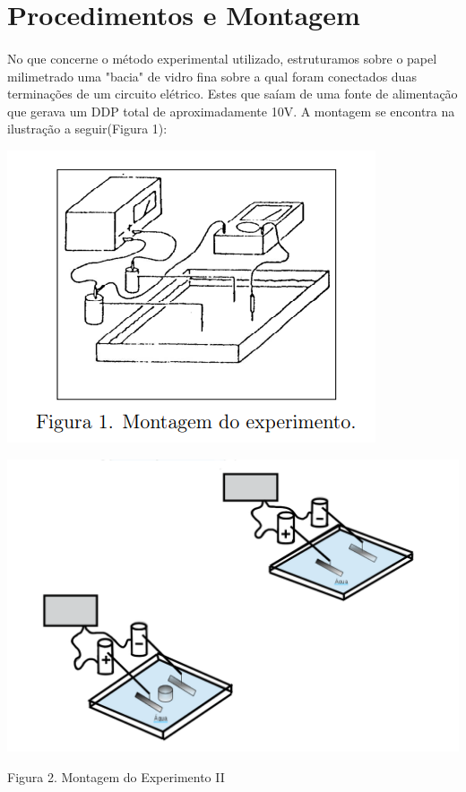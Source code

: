 \documentclass[column,brazilian,12pt,a4paper,final]{article}
\begin{document}
\section{Procedimentos e Montagem}
\paragraph{}
No  que concerne o método experimental utilizado, estruturamos sobre o papel milimetrado uma "bacia" de vidro fina sobre a qual foram conectados duas terminações de um circuito elétrico. Estes que saíam de uma fonte de alimentação que gerava um DDP total de aproximadamente 10V. A montagem se encontra na ilustração a seguir(Figura 1):
\singlespacing


    \centering
    \begin{minipage}{0.45\textwidth}
        \centering
        \includegraphics[width=\linewidth]{MECE.png}
      
        \label{fig:imagem1}
    \end{minipage}
    \hfill
    \begin{minipage}{0.45\textwidth}
        \centering
        \includegraphics[width=\linewidth]{MECEII.png}
        \caption{Figura 2. Montagem do Experimento II}
        \label{fig:imagem2}
    \end{minipage}
\end{document}
